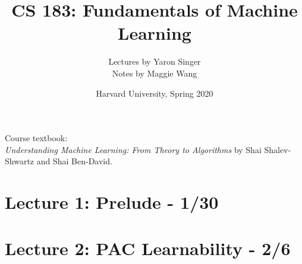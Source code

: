 \documentclass[8pt]{article}
\title{CS 183: Fundamentals of Machine Learning}
\author{Lectures by Yaron Singer \\
Notes by Maggie Wang}
\date{Harvard University, Spring 2020}
\begin{document}
\small

\maketitle

\noindent Course textbook: \\ \textit{Understanding Machine Learning: From Theory to Algorithms} by Shai Shalev-Shwartz and Shai Ben-David.

\begin{multicols*}{2}
  \tableofcontents
\end{multicols*}

\newpage

\fancyhfoffset[E,O]{0pt}

\twocolumn

\section{Lecture 1: Prelude - 1/30}


\newpage

\section{Lecture 2: PAC Learnability - 2/6}

\end{document}
